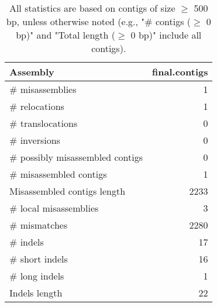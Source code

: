 \documentclass[12pt,a4paper]{article}
\begin{document}
\begin{table}[ht]
\begin{center}
\caption{All statistics are based on contigs of size $\geq$ 500 bp, unless otherwise noted (e.g., "\# contigs ($\geq$ 0 bp)" and "Total length ($\geq$ 0 bp)" include all contigs).}
\begin{tabular}{|l*{1}{|r}|}
\hline
Assembly & final.contigs \\ \hline
\# misassemblies & 1 \\ \hline
\hspace{5mm}\# relocations & 1 \\ \hline
\hspace{5mm}\# translocations & 0 \\ \hline
\hspace{5mm}\# inversions & 0 \\ \hline
\# possibly misassembled contigs & 0 \\ \hline
\# misassembled contigs & 1 \\ \hline
Misassembled contigs length & 2233 \\ \hline
\# local misassemblies & 3 \\ \hline
\# mismatches & 2280 \\ \hline
\# indels & 17 \\ \hline
\hspace{5mm}\# short indels & 16 \\ \hline
\hspace{5mm}\# long indels & 1 \\ \hline
Indels length & 22 \\ \hline
\end{tabular}
\end{center}
\end{table}
\end{document}
